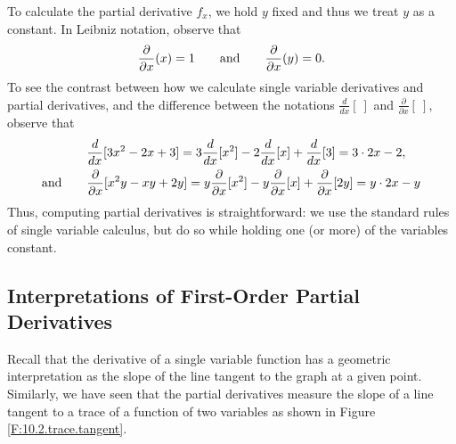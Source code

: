 To calculate the partial
derivative $f_x$, we hold $y$ fixed and thus we treat $y$ as a
constant.  In Leibniz notation, observe that 
$$
\frac{\partial }{\partial x} (x) = 1
\hspace*{20pt}
\mbox{and}
\hspace*{20pt}
\frac{\partial }{\partial x}(y) = 0.
$$
To see the contrast between how we calculate single variable derivatives and partial derivatives, and the difference between the notations $\frac{d}{dx}[ \ ]$ and $\frac{\partial}{\partial x}[ \ ]$, observe that
\begin{align*}
  & \frac{d}{dx}[3x^2 - 2x + 3] = 3\frac{d}{dx}[x^2] - 2\frac{d}{dx}[x]
  + \frac{d}{dx}[3] = 3\cdot 2x - 2, \\
  \mbox{and}\hspace*{20pt} & \frac{\partial}{\partial x}[x^2y - xy + 2y] =
  y\frac{\partial}{\partial x}[x^2] -
  y\frac{\partial}{\partial x}[x]
  + \frac{\partial}{\partial x}[2y] = y\cdot 2x - y 
\end{align*}
Thus, computing partial derivatives is straightforward:  we use the standard rules of single variable calculus, but do so while holding one (or more) of the variables constant.



\subsection*{Interpretations of First-Order Partial Derivatives}

Recall that the derivative of a single variable function has a
geometric interpretation as the slope of the line tangent to the graph
at a given point.  Similarly, we have seen that the partial
derivatives measure the slope of a line tangent to a trace of a
function of two variables as shown in Figure
\ref{F:10.2.trace.tangent}. 

